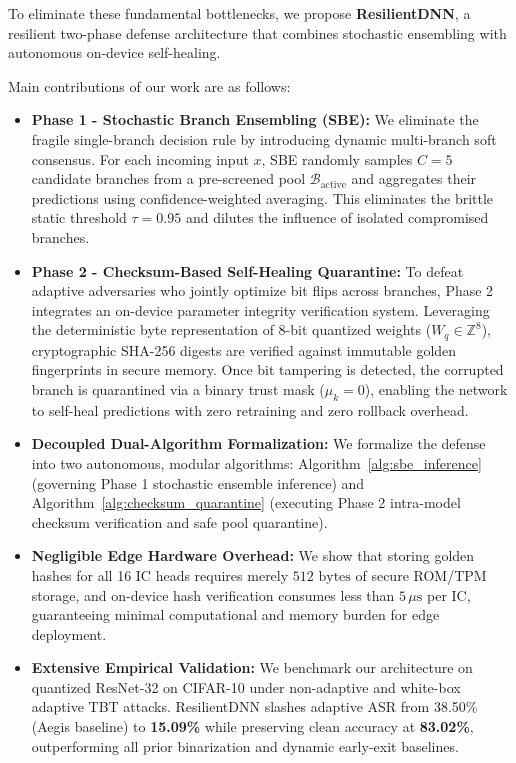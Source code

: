 \documentclass[conference,10pt]{IEEEtran}
\begin{document}
To eliminate these fundamental bottlenecks, we propose \textbf{ResilientDNN}, a resilient two-phase defense architecture that combines stochastic ensembling with autonomous on-device self-healing.

Main contributions of our work are as follows:

\begin{itemize}
    \item \textbf{Phase 1 - Stochastic Branch Ensembling (SBE):} We eliminate the fragile single-branch decision rule by introducing dynamic multi-branch soft consensus. For each incoming input $x$, SBE randomly samples $C = 5$ candidate branches from a pre-screened pool $\mathcal{B}_{\text{active}}$ and aggregates their predictions using confidence-weighted averaging. This eliminates the brittle static threshold $\tau = 0.95$ and dilutes the influence of isolated compromised branches.
    
    \item \textbf{Phase 2 - Checksum-Based Self-Healing Quarantine:} To defeat adaptive adversaries who jointly optimize bit flips across branches, Phase 2 integrates an on-device parameter integrity verification system. Leveraging the deterministic byte representation of 8-bit quantized weights ($W_q \in \mathbb{Z}^8$), cryptographic SHA-256 digests are verified against immutable golden fingerprints in secure memory. Once bit tampering is detected, the corrupted branch is quarantined via a binary trust mask ($\mu_k = 0$), enabling the network to self-heal predictions with zero retraining and zero rollback overhead.
    
    \item \textbf{Decoupled Dual-Algorithm Formalization:} We formalize the defense into two autonomous, modular algorithms: Algorithm~\ref{alg:sbe_inference} (governing Phase 1 stochastic ensemble inference) and Algorithm~\ref{alg:checksum_quarantine} (executing Phase 2 intra-model checksum verification and safe pool quarantine).
    
    \item \textbf{Negligible Edge Hardware Overhead:} We show that storing golden hashes for all 16 IC heads requires merely $512\text{ bytes}$ of secure ROM/TPM storage, and on-device hash verification consumes less than $5\,\mu\text{s}$ per IC, guaranteeing minimal computational and memory burden for edge deployment.
    
    \item \textbf{Extensive Empirical Validation:} We benchmark our architecture on quantized ResNet-32 on CIFAR-10 under non-adaptive and white-box adaptive TBT attacks. ResilientDNN slashes adaptive ASR from 38.50\% (Aegis baseline) to \textbf{15.09\%} while preserving clean accuracy at \textbf{83.02\%}, outperforming all prior binarization and dynamic early-exit baselines.
\end{itemize}
\end{document}
